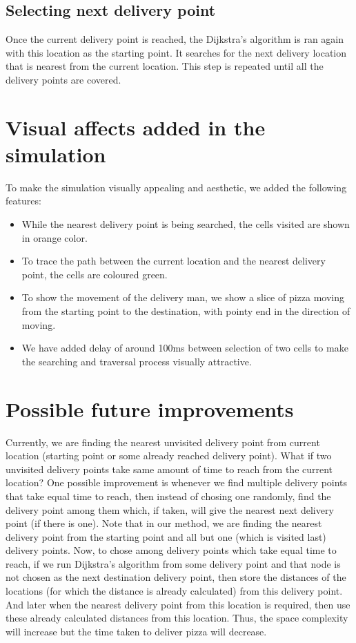 \documentclass{article}
\begin{document}
\subsection{Selecting next delivery point}
Once the current delivery point is reached, the Dijkstra's algorithm is ran again with this location as the starting point. It searches for the next delivery location that is nearest from the current location. This step is repeated until all the delivery points are covered.

\section{Visual affects added in the simulation}
To make the simulation visually appealing and aesthetic, we added the following features:
\begin{itemize}
\item While the nearest delivery point is being searched, the cells visited are shown in orange color.
\item To trace the path between the current location and the nearest delivery point, the cells are coloured green.
\item To show the movement of the delivery man, we show a slice of pizza moving from the starting point to the destination, with pointy end in the direction of moving.
\item We have added delay of around 100ms between selection of two cells to make the searching and traversal process visually attractive.
\end{itemize}
\section{Possible future improvements}
Currently, we are finding the nearest unvisited delivery point from current location (starting point or some already reached delivery point). What if two unvisited delivery points take same amount of time to reach from the current location? One possible improvement is whenever we find multiple delivery points that take equal time to reach, then instead of chosing one randomly, find the delivery point among them which, if taken, will give the nearest next delivery point (if there is one). Note that in our method, we are finding the nearest delivery point from the starting point and all but one (which is visited last) delivery points. Now, to chose among delivery points which take equal time to reach, if we run Dijkstra's algorithm from some delivery point and that node is not chosen as the next destination delivery point, then store the distances of the locations (for which the distance is already calculated) from this delivery point. And later when the nearest delivery point from this location is required, then use these already calculated distances from this location. Thus, the space complexity will increase but the time taken to deliver pizza will decrease.
\\
\end{document}

